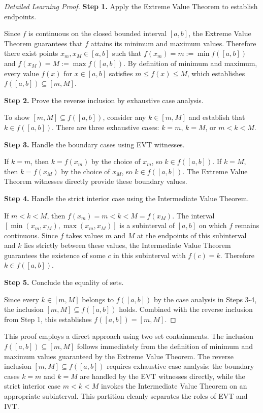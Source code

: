 \begin{proof}[Detailed Learning Proof]
\LRAProofBodyStart

\textbf{Step 1.} Apply the Extreme Value Theorem to establish endpoints.

Since $f$ is continuous on the closed bounded interval $[a,b]$, the Extreme Value Theorem guarantees that $f$ attains its minimum and maximum values. Therefore there exist points $x_m, x_M \in [a,b]$ such that $f(x_m) = m := \min f([a,b])$ and $f(x_M) = M := \max f([a,b])$. By definition of minimum and maximum, every value $f(x)$ for $x \in [a,b]$ satisfies $m \leq f(x) \leq M$, which establishes $f([a,b]) \subseteq [m, M]$.

\textbf{Step 2.} Prove the reverse inclusion by exhaustive case analysis.

To show $[m,M] \subseteq f([a,b])$, consider any $k \in [m,M]$ and establish that $k \in f([a,b])$. There are three exhaustive cases: $k = m$, $k = M$, or $m < k < M$.

\textbf{Step 3.} Handle the boundary cases using EVT witnesses.

If $k = m$, then $k = f(x_m)$ by the choice of $x_m$, so $k \in f([a,b])$. If $k = M$, then $k = f(x_M)$ by the choice of $x_M$, so $k \in f([a,b])$. The Extreme Value Theorem witnesses directly provide these boundary values.

\textbf{Step 4.} Handle the strict interior case using the Intermediate Value Theorem.

If $m < k < M$, then $f(x_m) = m < k < M = f(x_M)$. The interval $[\min(x_m, x_M), \max(x_m, x_M)]$ is a subinterval of $[a,b]$ on which $f$ remains continuous. Since $f$ takes values $m$ and $M$ at the endpoints of this subinterval and $k$ lies strictly between these values, the Intermediate Value Theorem guarantees the existence of some $c$ in this subinterval with $f(c) = k$. Therefore $k \in f([a,b])$.

\textbf{Step 5.} Conclude the equality of sets.

Since every $k \in [m,M]$ belongs to $f([a,b])$ by the case analysis in Steps 3-4, the inclusion $[m,M] \subseteq f([a,b])$ holds. Combined with the reverse inclusion from Step 1, this establishes $f([a,b]) = [m,M]$.
\end{proof}

\begin{remark*}
This proof employs a direct approach using two set containments. The inclusion $f([a,b]) \subseteq [m,M]$ follows immediately from the definition of minimum and maximum values guaranteed by the Extreme Value Theorem. The reverse inclusion $[m,M] \subseteq f([a,b])$ requires exhaustive case analysis: the boundary cases $k = m$ and $k = M$ are handled by the EVT witnesses directly, while the strict interior case $m < k < M$ invokes the Intermediate Value Theorem on an appropriate subinterval. This partition cleanly separates the roles of EVT and IVT.
\end{remark*}

